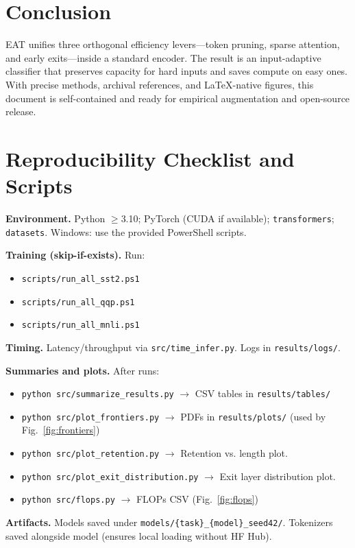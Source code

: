 \documentclass[11pt,letterpaper]{article}
\theoremstyle{plain}
\newcommand{\eat}{\textsc{EAT}}
\begin{document}
\section{Conclusion}
\eat{} unifies three orthogonal efficiency levers—token pruning, sparse attention, and early exits—inside a standard encoder. The result is an input-adaptive classifier that preserves capacity for hard inputs and saves compute on easy ones. With precise methods, archival references, and LaTeX-native figures, this document is self-contained and ready for empirical augmentation and open-source release.

\appendix
\section{Reproducibility Checklist and Scripts}
\textbf{Environment.} Python $\ge$3.10; PyTorch (CUDA if available); \texttt{transformers}; \texttt{datasets}. Windows: use the provided PowerShell scripts.

\textbf{Training (skip-if-exists).} Run:
\begin{itemize}
\item \texttt{scripts/run\_all\_sst2.ps1}
\item \texttt{scripts/run\_all\_qqp.ps1}
\item \texttt{scripts/run\_all\_mnli.ps1}
\end{itemize}

\textbf{Timing.} Latency/throughput via \texttt{src/time\_infer.py}. Logs in \texttt{results/logs/}.

\textbf{Summaries and plots.} After runs:
\begin{itemize}
\item \texttt{python src/summarize\_results.py} $\to$ CSV tables in \texttt{results/tables/}
\item \texttt{python src/plot\_frontiers.py} $\to$ PDFs in \texttt{results/plots/} (used by Fig.~\ref{fig:frontiers})
\item \texttt{python src/plot\_retention.py} $\to$ Retention vs. length plot.
\item \texttt{python src/plot\_exit\_distribution.py} $\to$ Exit layer distribution plot.
\item \texttt{python src/flops.py} $\to$ FLOPs CSV (Fig.~\ref{fig:flops})
\end{itemize}

\textbf{Artifacts.} Models saved under \texttt{models/\{task\}\_\{model\}\_seed42/}. Tokenizers saved alongside model (ensures local loading without HF Hub).


\end{document}
